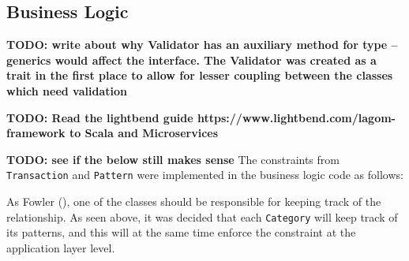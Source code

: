 \subsection{Business Logic} \label{sec:Implementation.BusinessLogic}
\textbf{TODO: write about why Validator has an auxiliary method for type --
generics would affect the interface. The Validator was created as a trait in
the first place to allow for lesser coupling between the classes which need
validation}

\textbf{TODO: Read the lightbend guide https://www.lightbend.com/lagom-framework to Scala and Microservices}

\textbf{TODO: see if the below still makes sense}
The constraints from \texttt{Transaction} and \texttt{Pattern} were implemented
in the business logic code as follows:
{
  \small
  
}

{
  \small
  
}

As Fowler (\citeyear[][]{fowler1997analysis}), one of the classes should be
responsible for keeping track of the relationship. As seen above, it was
decided that each \texttt{Category} will keep track of its patterns, and this
will at the same time enforce the constraint at the application layer level.
